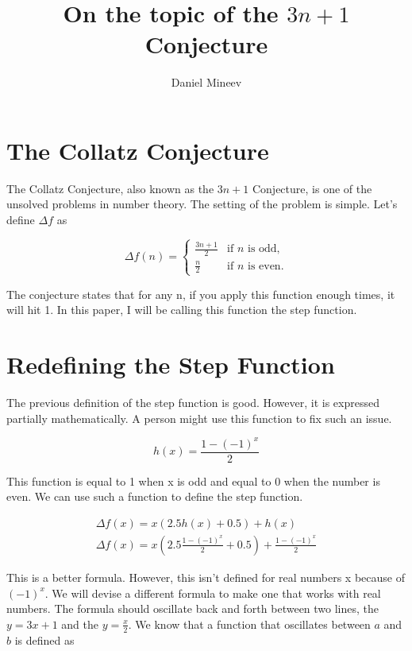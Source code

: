 \documentclass{article}
\title{On the topic of the \(3n+1\) Conjecture}
\author{Daniel Mineev}
\date{}
\begin{document}
\maketitle

\section{The Collatz Conjecture}

The Collatz Conjecture, also known as the \(3n+1\) Conjecture, is one of the unsolved problems in number theory.
The setting of the problem is simple. Let's define \(\Delta f\) as 

\begin{equation}	
  \Delta f(n) =
  \begin{cases}
    \frac{3n + 1}{2} & \text{if } n \text{ is odd}, \\
    \frac{n}{2} & \text{if } n \text{ is even}.
  \end{cases}
\end{equation}

The conjecture states that for any n, if you apply this function enough times, it will hit 1. In this paper, I will be calling this function the step function.

\section{Redefining the Step Function}

The previous definition of the step function is good.
However, it is expressed partially mathematically.
A person might use this function to fix such an issue.

\begin{equation}
  h(x) = \frac{1 - (-1)^x}{2}
\end{equation}

This function is equal to 1 when x is odd and equal to 0 when the number is even.
We can use such a function to define the step function. 

\begin{gather}
  \Delta f(x) = x(2.5h(x) + 0.5) + h(x) \nonumber \\
  \Delta f(x) = x(2.5\frac{1 - (-1)^x}{2} + 0.5) + \frac{1 - (-1)^x}{2}
\end{gather}

This is a better formula. However, this isn't defined for real numbers x because of \((-1)^x\). 
We will devise a different formula to make one that works with real numbers. 
The formula should oscillate back and forth between two lines, the \(y = 3x + 1\) and the \(y = \frac{x}{2}\).
We know that a function that oscillates between \(a\) and \(b\) is defined as
\end{document}
